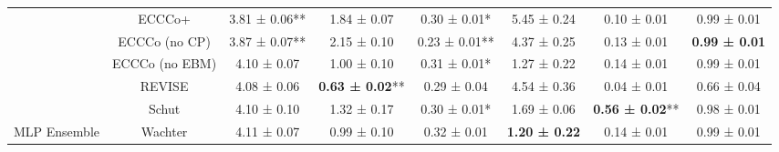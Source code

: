 \begin{table}
{\begin{tabular}[t]{cccccccc}
 & ECCCo+ & 3.81 ± 0.06** & 1.84 ± 0.07\hphantom{*}\hphantom{*} & 0.30 ± 0.01*\hphantom{*} & 5.45 ± 0.24\hphantom{*}\hphantom{*} & 0.10 ± 0.01\hphantom{*}\hphantom{*} & 0.99 ± 0.01\hphantom{*}\hphantom{*}\\

 & ECCCo (no CP) & 3.87 ± 0.07** & 2.15 ± 0.10\hphantom{*}\hphantom{*} & 0.23 ± 0.01** & 4.37 ± 0.25\hphantom{*}\hphantom{*} & 0.13 ± 0.01\hphantom{*}\hphantom{*} & \textbf{0.99 ± 0.01}\hphantom{*}\hphantom{*}\\

 & ECCCo (no EBM) & 4.10 ± 0.07\hphantom{*}\hphantom{*} & 1.00 ± 0.10\hphantom{*}\hphantom{*} & 0.31 ± 0.01*\hphantom{*} & 1.27 ± 0.22\hphantom{*}\hphantom{*} & 0.14 ± 0.01\hphantom{*}\hphantom{*} & 0.99 ± 0.01\hphantom{*}\hphantom{*}\\

 & REVISE & 4.08 ± 0.06\hphantom{*}\hphantom{*} & \textbf{0.63 ± 0.02}** & 0.29 ± 0.04\hphantom{*}\hphantom{*} & 4.54 ± 0.36\hphantom{*}\hphantom{*} & 0.04 ± 0.01\hphantom{*}\hphantom{*} & 0.66 ± 0.04\hphantom{*}\hphantom{*}\\

 & Schut & 4.10 ± 0.10\hphantom{*}\hphantom{*} & 1.32 ± 0.17\hphantom{*}\hphantom{*} & 0.30 ± 0.01*\hphantom{*} & 1.69 ± 0.06\hphantom{*}\hphantom{*} & \textbf{0.56 ± 0.02}** & 0.98 ± 0.01\hphantom{*}\hphantom{*}\\

\multirow[t]{-10}{*}{\centering\arraybackslash MLP Ensemble} & Wachter & 4.11 ± 0.07\hphantom{*}\hphantom{*} & 0.99 ± 0.10\hphantom{*}\hphantom{*} & 0.32 ± 0.01\hphantom{*}\hphantom{*} & \textbf{1.20 ± 0.22}\hphantom{*}\hphantom{*} & 0.14 ± 0.01\hphantom{*}\hphantom{*} & 0.99 ± 0.01\hphantom{*}\hphantom{*}\\
\bottomrule
\end{tabular}}
\end{table}
